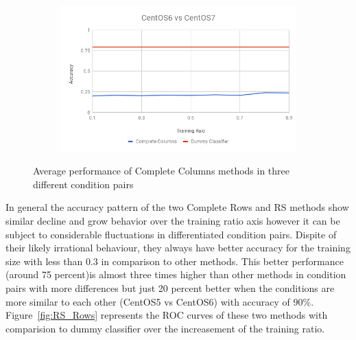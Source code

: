 \documentclass[10pt, conference, compsocconf]{IEEEtran}
\begin{document}
\begin{figure}[h!]
\begin{subfigure}[b]{0.3\linewidth}
        \end{subfigure}
        \begin{subfigure}[b]{0.3\linewidth}
                \includegraphics[width=\columnwidth]{figures/columns_6vs7}
        \end{subfigure}
        \caption{Average performance of Complete Columns methods in three different condition pairs}
        \label{fig:columns method}
\end{figure}
In general the accuracy pattern of the two Complete Rows and 
RS methods show similar decline and grow behavior over the 
training ratio axis however it can be subject to considerable 
fluctuations in differentiated condition pairs. Dispite of their 
likely irrational behaviour, they always have better accuracy 
for the training size with less than $0.3$ in comparison to other 
methods. This better performance (around 75 percent)is almost three 
times higher than other methods in condition pairs with more 
differences but just 20 percent better when the conditions are more 
similar to each other (CentOS5 vs CentOS6) with accuracy of $90\%$.
Figure~\ref{fig:RS_Rows} represents
the ROC curves of these two methods with comparision to dummy
classifier over the increasement of the training ratio.
\end{document}
